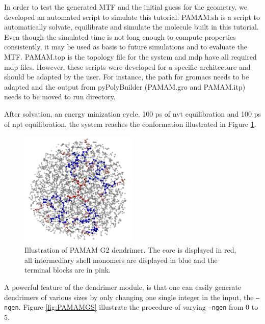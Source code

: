 In order to test the generated MTF and the initial guess for the geometry, we developed an automated script to simulate this tutorial.
PAMAM.sh is a script to automatically solvate, equilibrate and simulate the molecule built in this tutorial.
Even though the simulated time is not long enough to compute properties consistently, it may be used as basis to future simulations and to evaluate the MTF.
PAMAM.top is the topology file for the system and mdp  have all required mdp files.
However, these scripts were developed for a specific architecture and should be adapted by the user.
For instance, the path for gromacs needs to be adapted and the output from pyPolyBuilder (PAMAM.gro and PAMAM.itp) needs to be moved to run directory.

After solvation, an energy minization cycle, 100 ps of nvt equilibration and 100 ps of npt equilibration, the system reaches the conformation illustrated in Figure \ref{fig:PAMAMG2SOL}.

\begin{figure}[ht!]
    \centering
    \includegraphics[width=0.5\textwidth]{PAMAM/PAMAMSOL.pdf}
    \caption{Illustration of PAMAM G2 dendrimer. The core is displayed in red, all intermediary shell monomers are displayed in blue and the terminal blocks are in pink.}
    \label{fig:PAMAMG2SOL}
\end{figure}

A powerful feature of the dendrimer module, is that one can easily generate dendrimers of various sizes by only changing one single integer in the input, the \texttt{--ngen}.
Figure \ref{fig:PAMAMGS} illustrate the procedure of varying \texttt{--ngen} from 0 to 5.

